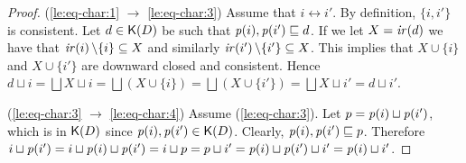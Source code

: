 \begin{proof}



  (\ref{le:eq-char:1} $\to$ \ref{le:eq-char:3})
  Assume that $i \leftrightarrow i'$. By definition, $\{i, i'\}$ is
  consistent. Let $d \in \mathop{\mathsf{K}({D})}$ be such that
  $\mathit{p}({i}), \mathit{p}({i'}) \sqsubseteq d$. If we let $X = \mathop{\mathit{ir}({d})}$ we have
  that $\mathop{\mathit{ir}({i})} \setminus \{i\} \subseteq X$ and similarly
  $\mathop{\mathit{ir}({i'})} \setminus \{i'\} \subseteq X$.  This implies that
  $X \cup \{ i \}$ and $X \cup \{ i' \}$ are downward closed and
  consistent. Hence
  $d \sqcup i = \bigsqcup X \sqcup i = \bigsqcup (X \cup \{ i \}) =
  \bigsqcup (X \cup \{ i' \}) = \bigsqcup X \sqcup i' = d \sqcup i'$.


  \bigskip

  (\ref{le:eq-char:3} $\to$ \ref{le:eq-char:4})
  Assume (\ref{le:eq-char:3}). Let $p = \mathit{p}({i}) \sqcup \mathit{p}({i'})$,
  which is in $\mathop{\mathsf{K}({D})}$ since
  $\mathit{p}({i}), \mathit{p}({i'}) \in \mathop{\mathsf{K}({D})}$. Clearly,
  $\mathit{p}({i}), \mathit{p}({i'}) \sqsubseteq p$.
  Therefore
  $i \sqcup \mathit{p}({i'}) = i \sqcup \mathit{p}({i}) \sqcup \mathit{p}({i'}) = i \sqcup
  p = p \sqcup i' = \mathit{p}({i}) \sqcup \mathit{p}({i'}) \sqcup i' = \mathit{p}({i})
  \sqcup i'$.


\end{proof}
